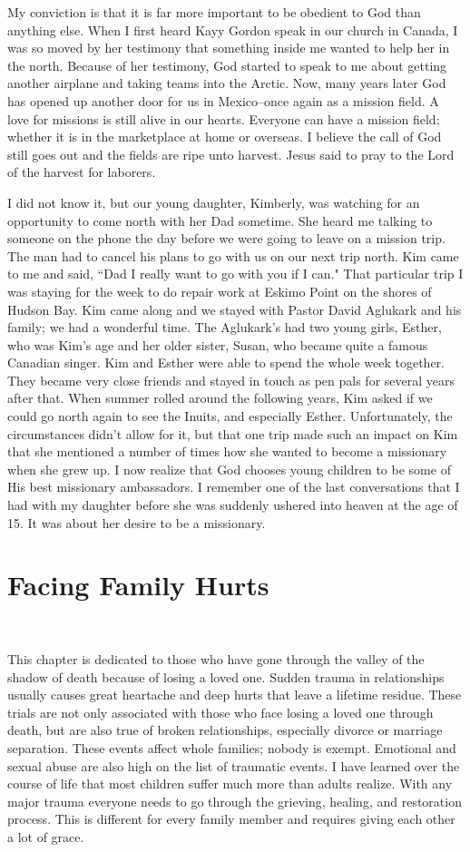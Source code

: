 \documentclass[oneside,12pt]{book}
\begin{document}
My conviction is that it is far more important to be obedient to God than anything else. When I first heard Kayy Gordon speak in our church in Canada, I was so moved by her testimony that something inside me wanted to help her in the north. Because of her testimony, God started to speak to me about getting another airplane and taking teams into the Arctic. Now, many years later God has opened up another door for us in Mexico--once again as a mission field. A love for missions is still alive in our hearts. Everyone can have a mission field; whether it is in the marketplace at home or overseas. I believe the call of God still goes out and the fields are ripe unto harvest. Jesus said to pray to the Lord of the harvest for laborers.

I did not know it, but our young daughter, Kimberly, was watching for an opportunity to come north with her Dad sometime. She heard me talking to someone on the phone the day before we were going to leave on a mission trip. The man had to cancel his plans to go with us on our next trip north. Kim came to me and said, ``Dad I really want to go with you if I can." That particular trip I was staying for the week to do repair work at Eskimo Point on the shores of Hudson Bay. Kim came along and we stayed with Pastor David Aglukark and his family; we had a wonderful time. The Aglukark's had two young girls, Esther, who was Kim's age and her older sister, Susan, who became quite a famous Canadian singer. Kim and Esther were able to spend the whole week together. They became very close friends and stayed in touch as pen pals for several years after that. When summer rolled around the following years, Kim asked if we could go north again to see the Inuits, and especially Esther. Unfortunately, the circumstances didn't allow for it, but that one trip made such an impact on Kim that she mentioned a number of times how she wanted to become a missionary when she grew up. I now realize that God chooses young children to be some of His best missionary ambassadors. I remember one of the last conversations that I had with my daughter before she was suddenly ushered into heaven at the age of 15. It was about her desire to be a missionary.


\chapter{Facing Family Hurts}
\

This chapter is dedicated to those who have gone through the valley of the shadow of death because of losing a loved one. Sudden trauma in relationships usually causes great heartache and deep hurts that leave a lifetime residue. These trials are not only associated with those who face losing a loved one through death, but are also true of broken relationships, especially divorce or marriage separation. These events affect whole families; nobody is exempt. Emotional and sexual abuse are also high on the list of traumatic events. I have learned over the course of life that most children suffer much more than adults realize. With any major trauma everyone needs to go through the grieving, healing, and restoration process. This is different for every family member and requires giving each other a lot of grace.
\end{document}
